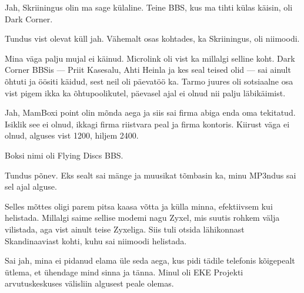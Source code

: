 Jah, Skriiningus olin ma sage külaline. Teine BBS, kus ma tihti 
külas käisin, oli Dark Corner.


Tundus vist olevat küll jah. Vähemalt osas kohtades, ka Skriiningus, oli 
niimoodi.


Mina väga palju mujal ei käinud. Microlink oli vist ka millalgi selline koht. 
Dark Corner BBSis --- Priit Kasesalu, Ahti 
Heinla ja kes seal teised olid --- sai 
ainult õhtuti ja öösiti käidud, sest neil oli päevatöö ka.
Tarmo juures oli sotsiaalne osa vist pigem ikka ka
õhtupoolikutel, päevasel ajal ei olnud nii palju 
läbikäimist.


Jah, MamBoxi point olin mõnda aega ja siis sai 
firma abiga enda oma tekitatud. Isiklik see ei olnud, ikkagi firma 
riistvara peal ja firma kontoris. Kiirust väga ei olnud, alguses vist 
1200, hiljem 2400. 


Boksi nimi oli Flying Discs BBS. 


Tundus põnev. Eks sealt sai mänge ja muusikat tõmbasin ka, minu MP3ndus 
sai sel ajal alguse.


Selles mõttes oligi parem pitsa kaasa võtta ja külla minna, efektiivsem kui helistada. Millalgi saime sellise modemi nagu 
Zyxel, mis suutis rohkem välja vilistada, aga vist 
ainult teise Zyxeliga. Siis tuli otsida lähikonnast Skandinaaviast 
kohti, kuhu sai niimoodi helistada.


Sai jah, mina ei pidanud elama üle seda aega, kus pidi tädile 
telefonis kõigepealt ütlema, et ühendage mind sinna ja tänna. Minul oli EKE 
Projekti arvutuskeskuses välisliin algusest peale olemas. 

